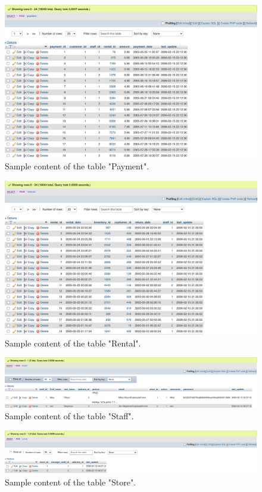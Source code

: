 \documentclass[openany]{article}
\begin{document}
		\begin{figure}[H]
			\includegraphics[width=\textwidth]{payment_content}
			\caption{Sample content of the table "Payment".}
		\end{figure}
		\begin{figure}[H]
			\includegraphics[width=\textwidth]{rental_content}
			\caption{Sample content of the table "Rental".}
		\end{figure}
		\begin{figure}[H]
			\includegraphics[width=\textwidth]{staff_content}
			\caption{Sample content of the table "Staff".}
		\end{figure}
		\begin{figure}[H]
			\includegraphics[width=\textwidth]{store_content}
			\caption{Sample content of the table "Store".}
		\end{figure}
\end{document}
